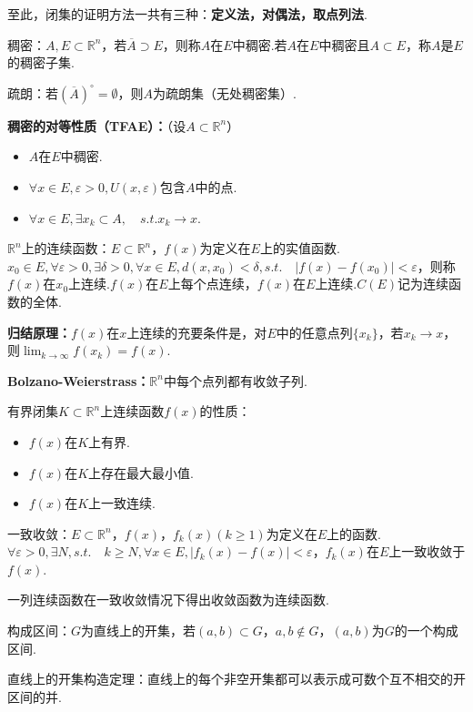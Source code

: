 \documentclass[bwprint, withoutpreface]{cumcmthesis}
\begin{document}
至此，闭集的证明方法一共有三种：\textbf{定义法，对偶法，取点列法}.

稠密：$A, E \subset \mathbb{R}^n$，若$\overline{A} \supset E$，则称$A$在$E$中稠密.若$A$在$E$中稠密且$A \subset E$，称$A$是$E$的稠密子集.

疏朗：若${(\overline{A})}^\circ=\emptyset$，则$A$为疏朗集（无处稠密集）.

\textbf{稠密的对等性质（TFAE）：}（设$A \subset \mathbb{R}^n$）
\begin{itemize}[itemindent=2em]
	\item $A$在$E$中稠密.
	\item $\forall x \in E, \varepsilon > 0, U(x, \varepsilon) \mbox{包含$A$中的点}$.
	\item $\forall x \in E, \exists {x_k} \subset A, \quad s.t. x_k \to x$.
\end{itemize}

$\mathbb{R}^n$上的连续函数：$E \subset \mathbb{R}^n$，$f(x)$为定义在$E$上的实值函数.$x_0 \in E, \forall \varepsilon > 0, \exists \delta > 0, \forall x \in E, d(x, x_0) < \delta, s.t. \quad |f(x) - f(x_0)| < \varepsilon$，则称$f(x)$在$x_0$上连续.$f(x)$在$E$上每个点连续，$f(x)$在$E$上连续.$C(E)$记为连续函数的全体.

\textbf{归结原理：}$f(x)$在$x$上连续的充要条件是，对$E$中的任意点列$\{x_k\}$，若$x_k \to x$，则$\lim_{k \to \infty}f(x_k) = f(x)$.

\textbf{Bolzano-Weierstrass：}$\mathbb{R}^n$中每个点列都有收敛子列.

有界闭集$K \subset \mathbb{R}^n$上连续函数$f(x)$的性质：
\begin{itemize}[itemindent=2em]
	\item $f(x)$在$K$上有界.
	\item $f(x)$在$K$上存在最大最小值.
	\item $f(x)$在$K$上一致连续.
\end{itemize}

一致收敛：$E \subset \mathbb{R}^n$，$f(x)，f_k(x)(k \geqslant 1)$为定义在$E$上的函数.$\forall \varepsilon > 0, \exists N, s.t. \quad k \geqslant N, \forall x \in E, |f_k(x) - f(x)| < \varepsilon$，$f_k(x)$在$E$上一致收敛于$f(x)$.

一列连续函数在一致收敛情况下得出收敛函数为连续函数.

构成区间：$G$为直线上的开集，若$(a, b) \subset G$，$a, b \not\in G$，$(a, b)$为$G$的一个构成区间.

直线上的开集构造定理：直线上的每个非空开集都可以表示成可数个互不相交的开区间的并.
\end{document}
